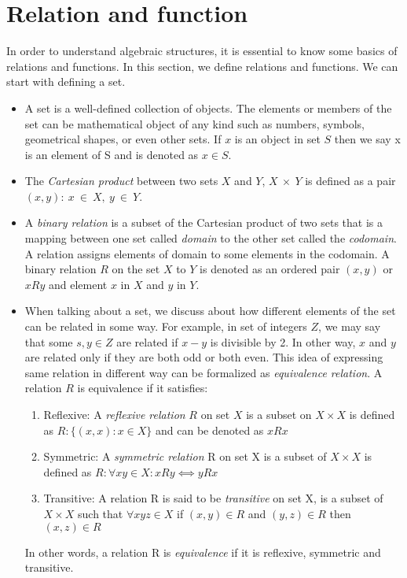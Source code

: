 \section{Relation and function}
In order to understand algebraic structures, it is essential to know some basics
of relations and functions. In this section, we define relations and functions.
We can start with defining a set.
\begin{itemize}
\item A set is a well-defined collection of objects. The elements or members of the
set can be mathematical object of any kind such as numbers, symbols, geometrical
shapes, or even other sets. If $x$ is an object in set $S$ then we say x is an
element of S and is denoted as $x \in S$.

\item The \emph{Cartesian product} between two sets $X$ and $Y$,  $X \ \times\
Y$ is defined as a pair ${(x,y) :\ x \ \in\ X,\ y\ \in\ Y }$. 

\item A \emph{binary relation} is a subset of the Cartesian product of two sets that
is a mapping between one set called \textit{domain} to the other set called the
\textit{codomain}. A relation assigns elements of domain to some elements in
the codomain. A binary relation $R$ on the set $X$ to $Y$ is denoted as an
ordered pair $(x,y)$ or $xRy$ and element $x$ in $X$ and $y$ in $Y$.

\item When talking about a set, we discuss about how different elements of the set can
be related in some way. For example, in set of integers $Z$, we may say that
some $s,y \in Z$ are related if $x-y$ is divisible by 2. In other way, $x$ and
$y$ are related only if they are both odd or both even. This idea of expressing
same relation in different way can be formalized as \textit{equivalence
relation}. A relation $R$ is equivalence if it satisfies:
\begin{enumerate}
    \item Reflexive: A \emph{reflexive relation} $R$ on set $X$ is a
subset on \(X \times X\)  is defined as \( R : \{(x,x) : x \in X\}\) and can be
denoted as $xRx$

    \item Symmetric: A \emph{symmetric relation} R on set X is a subset of \(X
\times X\) is defined as \(R: \forall x y \in X: xRy ⟺ yRx\)

    \item Transitive: A relation R is said to be \emph{transitive} on set X, is
a subset of \(X \times X\) such that \(∀ x y z \in X \) if \((x,y) \in R\) and
\((y,z) \in R \) then \((x,z) \in R\)
\end{enumerate}
In other words, a relation R is \emph{equivalence} if it is reflexive, symmetric and transitive.


\end{itemize}
